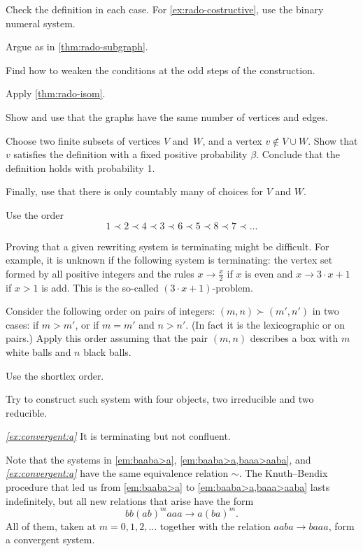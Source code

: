 Check the definition in each case.
For \ref{ex:rado-costructive}, use the binary numeral system.


Argue as in \ref{thm:rado-subgraph}.

Find how to weaken the conditions at the odd steps of the construction.

Apply \ref{thm:rado-isom}.

Show and use that the graphs have the same number of vertices and edges.

Choose two finite subsets of vertices $V$ and~$W$, and a vertex $v\notin V\cup W$.
Show that $v$ satisfies the definition with a fixed positive probability $\beta$.
Conclude that the definition holds with probability 1.

Finally, use that there is only countably many of choices for $V$ and $W$.

Use the order 
\[1\prec 2\prec 4\prec 3\prec 6\prec 5\prec 8\prec 7\prec\dots\]

Proving that a given rewriting system is terminating might be difficult.
For example,
it is unknown if the following system is terminating:
the vertex set formed by all positive integers and the rules $x\to \tfrac x2$ if $x$ is even and $x\to 3\cdot x+1$ if $x>1$ is add.
This is the so-called $(3\cdot x+1)$-problem.

Consider the following order on pairs of integers:
$(m,n)\succ(m',n')$ in two cases: if $m>m'$, or if $m=m'$ and $n>n'$.
(In fact it is the lexicographic or on pairs.)
Apply this order assuming that the pair $(m,n)$ describes a box with $m$ white balls and $n$ black balls.

Use the shortlex order.

Try to construct such system with four objects,
two irreducible and two reducible.

\textit{\ref{ex:convergent:a}} It is terminating but not confluent.

 Note that the systems in \ref{em:baaba>a}, \ref{em:baaba>a,baaa>aaba}, and \textit{\ref{ex:convergent:a}} have the same equivalence relation $\sim$.
The Knuth--Bendix procedure that led us from \ref{em:baaba>a} to \ref{em:baaba>a,baaa>aaba} lasts indefinitely, but all new relations that arise have the form
\[bb(ab)^{m}aaa\to a(ba)^m.\]
All of them, taken at $m=0,1,2,\dots$ together with the relation $aaba\to baaa$, form a convergent system.

